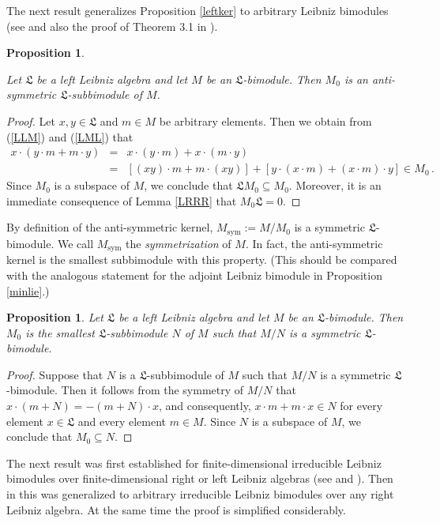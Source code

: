 \documentclass{amsart}
\newtheorem{pro}[thm]{Proposition}
\numberwithin{equation}{section}
\newcommand{\sym}{\mathrm{sym}}
\newcommand{\lf}{\mathfrak{L}}
\begin{document}
The next result generalizes Proposition \ref{leftker} to arbitrary Leibniz bimodules (see \cite[p.~145]{LP1}
and also the proof of Theorem 3.1 in \cite{FM}).

\begin{pro}\label{antisymker}

Let $\lf$ be a left Leibniz algebra and let $M$ be an $\lf$-bimodule. Then $M_0$ is an anti-symmetric
$\lf$-subbimodule of $M$.
\end{pro}

\begin{proof}
Let $x,y\in\lf$ and $m\in M$ be arbitrary elements. Then we obtain from (\ref{LLM}) and (\ref{LML})
that
\begin{eqnarray*}
x\cdot(y\cdot m+m\cdot y) & = & x\cdot(y\cdot m)+x\cdot(m\cdot y)\\
& = & [(xy)\cdot m+m\cdot(xy)]+[y\cdot(x\cdot m)+(x\cdot m)\cdot y]\in M_0\,.
\end{eqnarray*}
Since $M_0$ is a subspace of $M$, we conclude that $\lf M_0\subseteq M_0$. Moreover, it is an
immediate consequence of Lemma \ref{LRRR} that $M_0\lf=0$.
\end{proof}

By definition of the anti-symmetric kernel, $M_\sym:=M/M_0$ is a symmetric $\lf$-bimodule. We
call $M_\sym$ the {\em symmetrization\/} of $M$. In fact, the anti-symmetric kernel is the smallest
subbimodule with this property. (This should be compared with the analogous statement for the
adjoint Leibniz bimodule in Proposition \ref{minlie}.)

\begin{pro}\label{sym}
Let $\lf$ be a left Leibniz algebra and let $M$ be an $\lf$-bimodule. Then $M_0$ is the smallest
$\lf$-subbimodule $N$ of $M$ such that $M/N$ is a symmetric $\lf$-bimodule.
\end{pro}

\begin{proof}
Suppose that $N$ is a $\lf$-subbimodule of $M$ such that $M/N$ is a symmetric $\lf$-bimodule.
Then it follows from the symmetry of $M/N$ that $x\cdot(m+N)=-(m+N)\cdot x$, and consequently,
$x\cdot m+m\cdot x\in N$ for every element $x\in\lf$ and every element $m\in M$. Since $N$ is a
subspace of $M$, we conclude that $M_0\subseteq N$.
\end{proof}

The next result was first established for finite-dimensional irreducible Leibniz bimodules over
finite-dimensional right or left Leibniz algebras (see \cite[Theorem~3.1]{LP2} and \cite[Theorem
1.4]{B2}). Then in \cite[Theorem 3.1]{FM} this was generalized to arbitrary irreducible Leibniz
bimodules over any right Leibniz algebra. At the same time the proof is simplified considerably.
\end{document}
